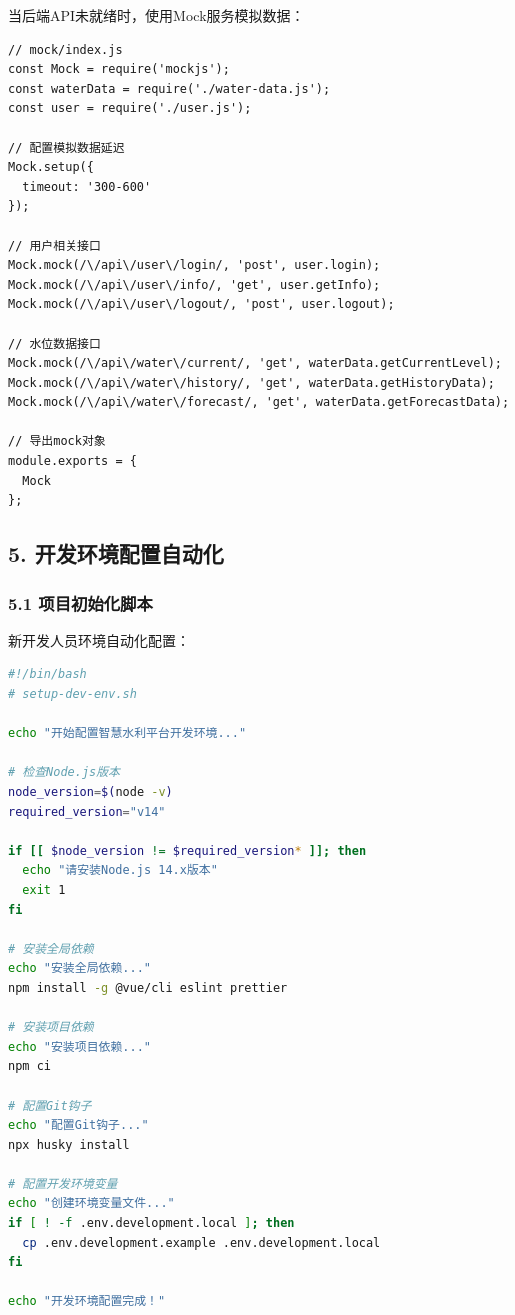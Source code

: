 当后端API未就绪时，使用Mock服务模拟数据：

\begin{lstlisting}
// mock/index.js
const Mock = require('mockjs');
const waterData = require('./water-data.js');
const user = require('./user.js');

// 配置模拟数据延迟
Mock.setup({
  timeout: '300-600'
});

// 用户相关接口
Mock.mock(/\/api\/user\/login/, 'post', user.login);
Mock.mock(/\/api\/user\/info/, 'get', user.getInfo);
Mock.mock(/\/api\/user\/logout/, 'post', user.logout);

// 水位数据接口
Mock.mock(/\/api\/water\/current/, 'get', waterData.getCurrentLevel);
Mock.mock(/\/api\/water\/history/, 'get', waterData.getHistoryData);
Mock.mock(/\/api\/water\/forecast/, 'get', waterData.getForecastData);

// 导出mock对象
module.exports = {
  Mock
};
\end{lstlisting}

\subsection{5.
开发环境配置自动化}\label{ux5f00ux53d1ux73afux5883ux914dux7f6eux81eaux52a8ux5316}

\subsubsection{5.1
项目初始化脚本}\label{ux9879ux76eeux521dux59cbux5316ux811aux672c}

新开发人员环境自动化配置：

\begin{lstlisting}[language=bash]
#!/bin/bash
# setup-dev-env.sh

echo "开始配置智慧水利平台开发环境..."

# 检查Node.js版本
node_version=$(node -v)
required_version="v14"

if [[ $node_version != $required_version* ]]; then
  echo "请安装Node.js 14.x版本"
  exit 1
fi

# 安装全局依赖
echo "安装全局依赖..."
npm install -g @vue/cli eslint prettier

# 安装项目依赖
echo "安装项目依赖..."
npm ci

# 配置Git钩子
echo "配置Git钩子..."
npx husky install

# 配置开发环境变量
echo "创建环境变量文件..."
if [ ! -f .env.development.local ]; then
  cp .env.development.example .env.development.local
fi

echo "开发环境配置完成！"
\end{lstlisting}

